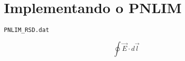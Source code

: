 \section{Implementando o PNLIM}

\verb|PNLIM_RSD.dat|

\begin{equation}
    \oint \vec{E}\cdot d\vec{l}
\end{equation}
